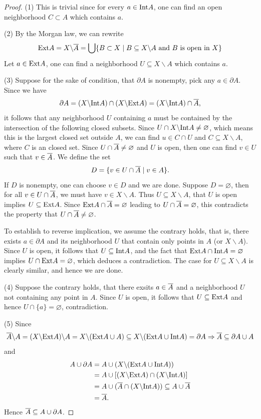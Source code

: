 \begin{proof}
    (1) This is trivial since for every $a \in \mathrm{Int}{A}$, one can find an open neighborhood $C \subset A$ which contains $a$.

    (2) By the Morgan law, we can rewrite
    \[
        \mathrm{Ext}{A} = X \backslash \overline{A} = \bigcup\{B \subset X\mid B \subseteq X \backslash A \text{ and $B$ is open in $X$}\}
    \]
    Let $a \in \mathrm{Ext}{A}$, one can find a neighborhood $U \subseteq X \backslash A$ which contains $a$.

    (3) Suppose for the sake of condition, that $\partial A$ is nonempty, pick any $a \in \partial A$. Since we have 
    \[
        \partial{A} = (X\backslash \mathrm{Int}{A}) \cap (X\backslash \mathrm{Ext}{A}) = (X\backslash \mathrm{Int}{A}) \cap \overline{A},
    \]
    it follows that any neighborhood $U$ containing $a$ must be contained by the intersection of the following closed subsets. Since $U \cap X \backslash \mathrm{Int}{A} \neq \varnothing$, which means this is the largest closed set outside $A$, we can find $u \in C \cap U$ and $C \subseteq X \backslash A$, where $C$ is an closed set. Since $U \cap \overline{A} \neq \varnothing$ and $U$ is open, then one can find $v \in U$ such that $v \in \overline{A}$. We define the set 
    \[
        D = \{v \in U \cap \overline{A}\mid v \in A\}.
    \]
    If $D$ is nonempty, one can choose $v \in D$ and we are done. Suppose $D = \varnothing$, then for all $v \in U \cap \overline{A}$, we must have $v \in X \backslash A$. Thus $U \subseteq X \backslash A$, that $U$ is open implies $U \subseteq \mathrm{Ext}{A}$. Since $\mathrm{Ext}{A} \cap \overline{A} = \varnothing$ leading to $U \cap \overline{A} = \varnothing$, this contradicts the property that $U \cap \overline{A} \neq \varnothing$.

    To establish to reverse implication, we assume the contrary holds, that is, there exists $a \in \partial A$ and its neighborhood $U$ that contain only points in $A$ (or $X \backslash A$). Since $U$ is open, it follows that $U \subseteq \mathrm{Int}{A}$, and the fact that $\mathrm{Ext}{A} \cap \mathrm{Int}{A} = \varnothing$ implies $U \cap \mathrm{Ext}{A} = \varnothing$, which deduces a contradiction. The case for $U \subseteq X \backslash A$ is clearly similar, and hence we are done.

    (4) Suppose the contrary holds, that there exsits $a \in \overline{A}$ and a neighborhood $U$ not containing any point in $A$. Since $U$ is open, it follows that $U \subseteq \mathrm{Ext}{A}$ and hence $U \cap \{a\} = \varnothing$, contradiction.

    (5) Since \[\overline{A} \backslash A = (X \backslash {\mathrm{Ext}{A}}) \backslash A = X \backslash (\mathrm{Ext} {A} \cup A)  \subseteq X \backslash (\mathrm{Ext}{A} \cup \mathrm{Int}{A}) = \partial{A} \Rightarrow \overline{A} \subseteq \partial A \cup A\]
    and 
    \begin{align*}
        A \cup \partial A &= A \cup (X \backslash (\mathrm{Ext}{A} \cup \mathrm{Int}{A}))\\
        &= A \cup [(X \backslash \mathrm{Ext}{A}) \cap (X \backslash \mathrm{Int}{A})]\\
        &= A \cup (\overline{A} \cap (X \backslash \mathrm{Int}{A})) \subseteq A \cup \overline{A}\\
        &= \overline{A}.
    \end{align*}  
    Hence $\overline{A} \subseteq A \cup \partial A$.


\end{proof}
